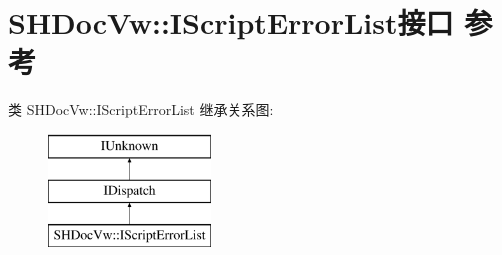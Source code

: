 \hypertarget{interface_s_h_doc_vw_1_1_i_script_error_list}{}\section{S\+H\+Doc\+Vw\+:\+:I\+Script\+Error\+List接口 参考}
\label{interface_s_h_doc_vw_1_1_i_script_error_list}
类 S\+H\+Doc\+Vw\+:\+:I\+Script\+Error\+List 继承关系图\+:\begin{figure}[H]
\begin{center}
\leavevmode
\includegraphics[height=3.000000cm]{interface_s_h_doc_vw_1_1_i_script_error_list}
\end{center}
\end{figure}
